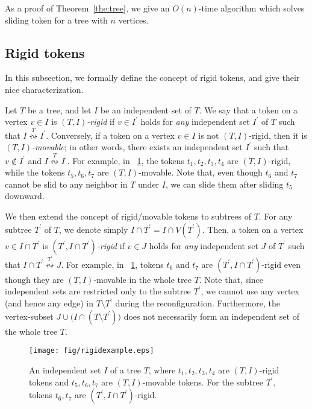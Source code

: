 \documentclass{llncs}
\newcommand{\bfI}{I}
\newcommand{\sevstep}{\leftrightsquigarrow}
\newcommand{\sevstepT}[1]{\overset{#1}{\sevstep}}
\begin{document}
	As a proof of Theorem~\ref{the:tree}, we give an $O(n)$-time algorithm which solves {\sc sliding token} for a tree with $n$ vertices. 


	
	\subsection{Rigid tokens}
	
	In this subsection, we formally define the concept of rigid tokens, and give their nice characterization. 
\smallskip
	
	Let $T$ be a tree, and let $\bfI$ be an independent set of $T$. 
	We say that a token on a vertex $v \in \bfI$ is \emph{$(T, \bfI)$-rigid} if $v \in \bfI^\prime$ holds for \emph{any} independent set $\bfI^\prime$ of $T$ such that $\bfI \sevstepT{T} \bfI^\prime$. 
	Conversely, if a token on a vertex $v \in \bfI$ is not $(T, \bfI)$-rigid, then it is \emph{$(T, \bfI)$-movable};
in other words, there exists an independent set $\bfI^\prime$ such that $v \not\in \bfI^\prime$ and $\bfI \sevstepT{T} \bfI^\prime$. 
	For example, in \figurename~\ref{fig:rigidexample}, the tokens $t_1, t_2, t_3, t_4$ are $(T, \bfI)$-rigid, while the tokens $t_5, t_6, t_7$ are $(T, \bfI)$-movable. 
	Note that, even though $t_6$ and $t_7$ cannot be slid to any neighbor in $T$ under $\bfI$, we can slide them after sliding $t_5$ downward. 
	
	We then extend the concept of rigid/movable tokens to subtrees of $T$. 
	For any subtree $T^\prime$ of $T$, we denote simply $\bfI \cap T^\prime =  \bfI \cap V(T^\prime)$.
	Then, a token on a vertex $v \in \bfI \cap T^\prime$ is \emph{$(T^\prime, \bfI \cap T^\prime)$-rigid} if $v \in J$ holds for \emph{any} independent set $J$ of $T^\prime$ such that $\bfI \cap T^\prime \sevstepT{T^\prime} J$.
	For example, in \figurename~\ref{fig:rigidexample}, tokens $t_6$ and $t_7$ are $(T^\prime, \bfI \cap T^\prime)$-rigid even though they are $(T, \bfI)$-movable in the whole tree $T$. 
	Note that, since independent sets are restricted only to the subtree $T^\prime$, we cannot use any vertex (and hence any edge) in $T \setminus T^\prime$ during the reconfiguration. 
	Furthermore, the vertex-subset $J \cup \bigl(\bfI \cap (T \setminus T^\prime) \bigr)$ does not necessarily form an independent set of the whole tree $T$. 
\medskip

\begin{figure}[t]
\begin{center}
	\texttt{[image: fig/rigidexample.eps]}
	\end{center}
	\vspace{-1em}
	\caption{An independent set $\bfI$ of a tree $T$, where $t_1, t_2, t_3, t_4$ are $(T, \bfI)$-rigid tokens and $t_5, t_6, t_7$ are $(T, \bfI)$-movable tokens. For the subtree $T^\prime$, tokens $t_6, t_7$ are $(T^\prime, \bfI \cap T^\prime)$-rigid.}
	\label{fig:rigidexample}
\end{figure}
\end{document}
